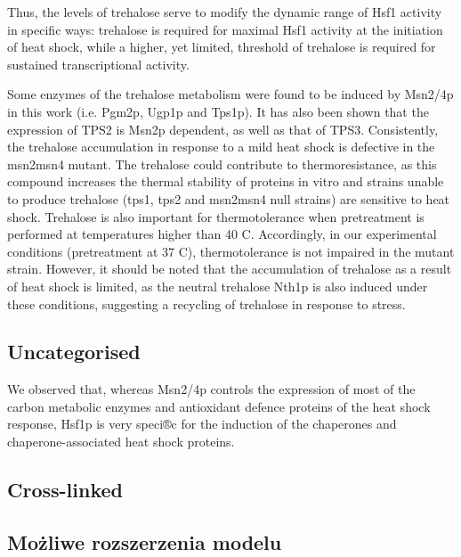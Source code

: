 \documentclass{pracamgr}
\begin{document}
Thus, the levels of trehalose serve to modify
the dynamic range of Hsf1 activity in specific ways: trehalose is
required for maximal Hsf1 activity at the initiation of heat
shock, while a higher, yet limited, threshold of trehalose is
required for sustained transcriptional activity.\cite{TrehaloseRegulatorHsf}

Some enzymes of the trehalose
metabolism were found to be induced by Msn2/4p in this
work (i.e. Pgm2p, Ugp1p and Tps1p). It has also been
shown that the expression of TPS2 is Msn2p dependent, as well as that of TPS3. Consistently, the trehalose
accumulation in response to a mild heat shock is defective in
the msn2msn4 mutant. The trehalose could contribute to thermoresistance, as this compound
increases the thermal stability of proteins in vitro and strains unable to produce trehalose
(tps1, tps2 and msn2msn4 null strains) are sensitive to
heat shock. Trehalose is also important for thermotolerance when pretreatment
is performed at temperatures higher than 40 C. Accordingly, in our experimental conditions
(pretreatment at 37 C), thermotolerance is not impaired in
the mutant strain. However, it should be noted that the
accumulation of trehalose as a result of heat shock is
limited, as the neutral trehalose Nth1p is also induced
under these conditions, suggesting a recycling of trehalose in response to stress.\cite{MsnContraHsf1}


\subsection{Uncategorised}
We observed that, whereas Msn2/4p controls the expression
of most of the carbon metabolic enzymes and antioxidant
defence proteins of the heat shock response, Hsf1p is very
speci®c for the induction of the chaperones and chaperone-associated heat shock proteins.\cite{MsnContraHsf1}

\subsection{Cross-linked}

\subsection{Możliwe rozszerzenia modelu}
\end{document}
